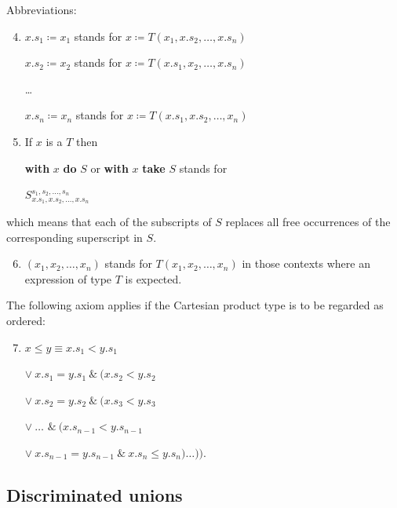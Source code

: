 \documentclass[twoside,11pt]{book}
\begin{document}
\noindent
Abbreviations:

\begin{enumerate}[leftmargin=2\parindent, label=(\arabic*)]
	\setcounter{enumi}{3}
	\item $x.s_1 \coloneq x_1$ stands for $x\coloneq T(x_1, x.s_2, \dots, x.s_n)$

	$x.s_2 \coloneq x_2$ stands for $x\coloneq T(x.s_1, x_2, \dots, x.s_n)$

	\qquad \dots

	$x.s_n \coloneq x_n$ stands for $x\coloneq T(x.s_1, x.s_2, \dots, x_n)$

	\item If $x$ is a $T$ then
	
	\textbf{with} $x$ \textbf{do} $S$ or \textbf{with} $x$ \textbf{take} $S$ stands for
	
	\quad $S_{x.s_1, x.s_2, \dots, x.s_n}^{s_1, s_2, \dots, s_n}$
\end{enumerate}

\noindent
which means that each of the subscripts of $S$ replaces all free occurrences of the corresponding superscript in $S$.

\begin{enumerate}[leftmargin=2\parindent, label=(\arabic*)]
	\setcounter{enumi}{5}
	\item $(x_1, x_2, \dots, x_n)$ stands for $T(x_1, x_2, \dots, x_n)$ in those contexts where an expression of type $T$ is expected.
\end{enumerate}

The following axiom applies if the Cartesian product type is to be regarded as ordered:
	
\begin{enumerate}[leftmargin=2\parindent, label=(\arabic*)]
	\setcounter{enumi}{6}
	\item $x \leqslant y \equiv$\quad $x.s_1 < y.s_1$
		
	\tabto*{3.2em}$\vee\ x.s_1 = y.s_1\ \&\ (x.s_2 < y.s_2$
	
	\tabto*{3.2em}$\vee\ x.s_2 = y.s_2\ \&\ (x.s_3 < y.s_3$
	
	\tabto*{3.2em}$\vee\ \dots$ \tabto*{8.6em}$\&\ (x.s_{n - 1} < y.s_{n-1}$
	
	\tabto*{3.2em}$\vee\ x.s_{n-1} = y.s_{n-1}\ \&\ x.s_n \leqslant y.s_n)\dots)).$
\end{enumerate}

\subsection{Discriminated unions}
\end{document}
